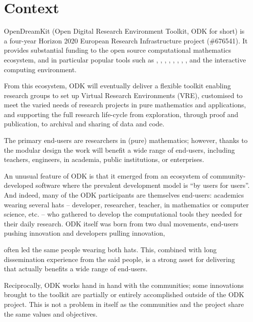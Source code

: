 \documentclass{deliverablereport}
\author{Nicolas M. Thiéry et al.}
\begin{document}
\enlargethispage{4ex}
\maketitle
\githubissuedescription
\tableofcontents\newpage


\section{Context}

OpenDreamKit (Open Digital Research Environment Toolkit, ODK for
short) is a four-year Horizon 2020 European Research Infrastructure
project (\#676541). It provides substantial funding to the open source
computational mathematics ecosystem, and in particular popular tools
such as \Linbox, \MPIR, \Sage, \GAP, \PariGP, \LMFDB, \Singular,
\MathHub, and the \Jupyter interactive computing environment.

From this ecosystem, ODK will eventually deliver a flexible toolkit
enabling research groups to set up Virtual Research Environments
(VRE), customised to meet the varied needs of research projects in
pure mathematics and applications, and supporting the full research
life-cycle from exploration, through proof and publication, to
archival and sharing of data and code.

The primary end-users are researchers in (pure) mathematics; however,
thanks to the modular design the work will benefit a wide range of
end-users, including teachers, engineers, in academia, public
institutions, or enterprises.

An unusual feature of ODK is that it emerged from an ecosystem of
community-developed software where the prevalent development model is
``by users for users''. And indeed, many of the ODK participants are
themselves end-users: academics wearing several hats -- developer,
researcher, teacher, in mathematics or computer science, etc. -- who
gathered to develop the computational tools they needed for their daily
research. ODK itself was born from two dual movements,
end-users pushing innovation and developers pulling innovation,

often
led the same people wearing both hats. This, combined with long
dissemination experience from the said people, is a strong asset for
delivering that actually benefits a wide range of end-users.

Reciprocally, ODK works hand in hand with the communities; some
innovations brought to the toolkit are partially or entirely
accomplished outside of the ODK project. This is not a
problem in itself as the communities and the project share the same
values and objectives.
\end{document}
